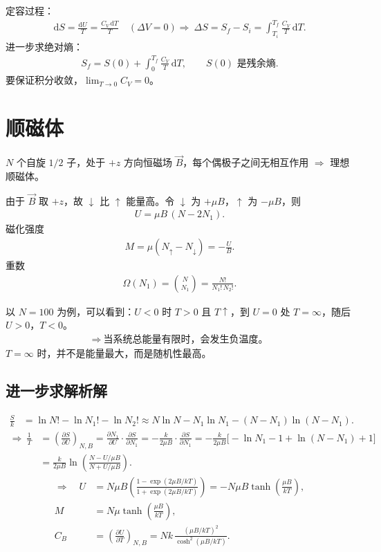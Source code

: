 定容过程：
\begin{align}
\mathrm{d}S=\frac{\mathrm{d}U}{T}=\frac{C_V\,\mathrm{d}T}{T}\quad (\Delta V=0)
\Rightarrow\ \Delta S=S_f-S_i=\int_{T_i}^{T_f}\frac{C_V}{T}\,\mathrm{d}T.
\end{align}
进一步求绝对熵：
\begin{align}
S_f=S(0)+\int_{0}^{T_f}\frac{C_V}{T}\,\mathrm{d}T,\qquad S(0)\text{ 是残余熵}.
\end{align}
要保证积分收敛，$\lim_{T\to 0}C_V=0$。

\section{顺磁体}
$N$ 个自旋 $1/2$ 子，处于 $+z$ 方向恒磁场 $\vec B$，每个偶极子之间无相互作用 $\Rightarrow$ 理想顺磁体。

由于 $\vec B$ 取 $+z$，故 $\downarrow$ 比 $\uparrow$ 能量高。令 $\downarrow$ 为 $+\mu B$，$\uparrow$ 为 $-\mu B$，则
\begin{align}
U=\mu B\,(N-2N_1).
\end{align}
磁化强度
\begin{align}
M=\mu(N_\uparrow-N_\downarrow)=-\frac{U}{B}.
\end{align}
重数
\begin{align}
\Omega(N_1)=\binom{N}{N_1}=\frac{N!}{N_1!\,N_2!}.
\end{align}

以 $N=100$ 为例，可以看到：$U<0$ 时 $T>0$ 且 $T\uparrow$，到 $U=0$ 处 $T=\infty$，随后 $U>0$，$T<0$。
\begin{align}
\Rightarrow\ \text{当系统总能量有限时，会发生负温度。}
\end{align}
$T=\infty$ 时，并不是能量最大，而是随机性最高。

\subsection*{进一步求解析解}
\begin{align}
\frac{S}{k}
&=\ln N!-\ln N_1!-\ln N_2!
\approx N\ln N-N_1\ln N_1-(N-N_1)\ln(N-N_1).
\end{align}
\begin{align}
\Rightarrow\ \frac{1}{T}
&=\left(\frac{\partial S}{\partial U}\right)_{N,B}
=\frac{\partial N_1}{\partial U}\cdot\frac{\partial S}{\partial N_1}
=-\frac{k}{2\mu B}\cdot\frac{\partial S}{\partial N_1}
=-\frac{k}{2\mu B}\bigl[-\ln N_1-1+\ln(N-N_1)+1\bigr]\\
&=\frac{k}{2\mu B}\ln\left(\frac{N-U/\mu B}{N+U/\mu B}\right).
\end{align}
\begin{align}
\Rightarrow\quad
U&=N\mu B\left(\frac{1-\exp(2\mu B/kT)}{1+\exp(2\mu B/kT)}\right)
=-N\mu B\tanh\left(\frac{\mu B}{kT}\right),\\
M&=N\mu\tanh\left(\frac{\mu B}{kT}\right),\\
C_B&=\left(\frac{\partial U}{\partial T}\right)_{N,B}
=Nk\,\frac{(\mu B/kT)^2}{\cosh^2(\mu B/kT)}.
\end{align}

